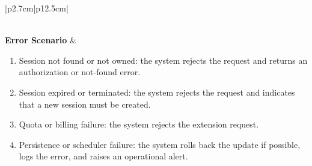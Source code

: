 \begin{table}[H]
\begin{tabular}{|p{2.7cm}|p{12.5cm}|}
\begin{minipage}[t]{\linewidth}
\begin{enumerate}[topsep=0pt,itemsep=1pt,parsep=0pt,partopsep=0pt]
            \end{enumerate}
        \end{minipage} \\
        \hline
        \textbf{Error Scenario} & \begin{minipage}[t]{\linewidth}
            \begin{enumerate}[topsep=0pt,itemsep=1pt,parsep=0pt,partopsep=0pt]
                \item Session not found or not owned: the system rejects the request and returns an authorization or not-found error.
                \item Session expired or terminated: the system rejects the request and indicates that a new session must be created.
                \item Quota or billing failure: the system rejects the extension request.
                \item Persistence or scheduler failure: the system rolls back the update if possible, logs the error, and raises an operational alert.
            \end{enumerate}
        \end{minipage} \\
        \hline
    \end{tabular}
    \label{tab:eng-extend-session}
\end{table}
\iffalse
{}
